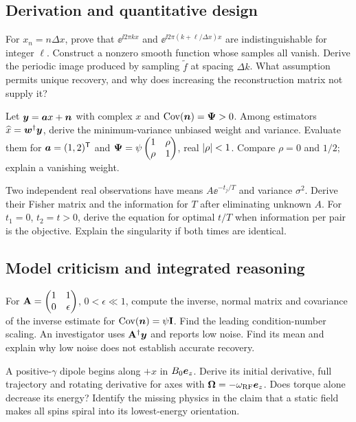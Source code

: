 \subsection{Derivation and quantitative design}
\begin{challengeproblem}
\label{prob:01:alias}
For $x_n=n\Delta x$, prove that
$\ee^{\ii2\pi kx}$ and $\ee^{\ii2\pi(k+\ell/\Delta x)x}$
are indistinguishable for integer $\ell$. Construct a nonzero smooth
function whose samples all vanish. Derive the periodic image produced
by sampling $\widetilde f$ at spacing $\Delta k$. What assumption permits
unique recovery, and why does increasing the reconstruction matrix not
supply it?
\end{challengeproblem}
\begin{challengeproblem}
\label{prob:01:blue}
Let $\bm{y}=\bm{a} x+\bm{n}$ with complex $x$ and
$\operatorname{Cov}(\bm{n})=\mathbf{\Psi}>0$. Among estimators
$\widehat x=\bm{w}^{\dagger}\bm{y}$, derive the minimum-variance unbiased
weight and variance. Evaluate them for $\bm{a}=(1,2)^{\mathsf T}$ and
$\mathbf{\Psi}=\psi\begin{pmatrix}1&\rho\\\rho&1\end{pmatrix}$,
real $\lvert\rho\rvert<1$. Compare $\rho=0$ and $1/2$; explain a vanishing weight.
\end{challengeproblem}
\begin{challengeproblem}
\label{prob:01:fisher}
Two independent real observations have means $A\ee^{-t_j/T}$ and
variance $\sigma^2$. Derive their Fisher matrix and the information for
$T$ after eliminating unknown $A$. For $t_1=0$, $t_2=t>0$,
derive the equation for optimal $t/T$ when information per pair is the
objective. Explain the singularity if both times are identical.
\end{challengeproblem}
\subsection{Model criticism and integrated reasoning}
\begin{challengeproblem}
\label{prob:01:adjoint}
For $\mathbf{A}=\begin{pmatrix}1&1\\0&\epsilon\end{pmatrix}$,
$0<\epsilon\ll1$, compute the inverse, normal matrix and covariance
of the inverse estimate for $\operatorname{Cov}(\bm{n})=\psi\mathbf{I}$.
Find the leading condition-number scaling. An investigator uses
$\mathbf{A}^{\dagger}\bm{y}$ and reports low noise. Find its mean and explain
why low noise does not establish accurate recovery.
\end{challengeproblem}
\begin{challengeproblem}
\label{prob:01:torque}
A positive-$\gamma$ dipole begins along $+x$ in $B_0\bm{e}_z$.
Derive its initial derivative, full trajectory and rotating derivative
for axes with $\bm{\Omega}=-\omega_{\rm RF}\bm{e}_z$.
Does torque alone decrease its energy? Identify the missing physics in
the claim that a static field makes all spins spiral into its
lowest-energy orientation.
\end{challengeproblem}
